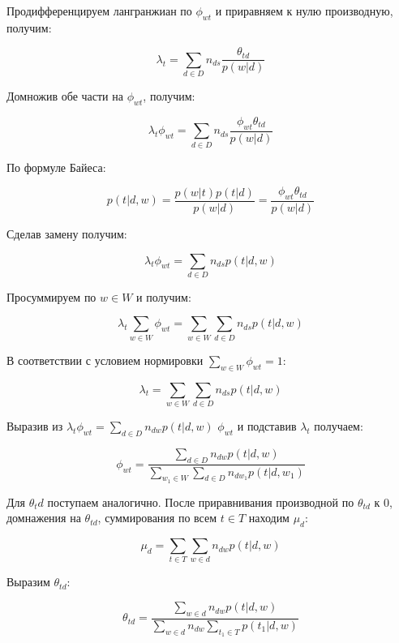 Продифференцируем лангранжиан по $\phi_{wt}$ и приравняем к нулю производную, получим:

$$\lambda_{t} = \sum_{d \in D} n_{ds} \frac{\theta_{td}}{p(w|d)}$$

Домножив обе части на $\phi_{wt}$, получим:

$$\lambda_{t} \phi_{wt} = \sum_{d \in D} n_{ds} \frac{\phi_{wt} \theta_{td}}{p(w|d)}$$

По формуле Байеса:

$$p(t|d,w) = \frac{p(w|t) p(t|d)}{p(w|d)} = \frac{\phi_{wt} \theta_{td}}{p(w|d)}$$

Сделав замену  получим:

$$\lambda_{t} \phi_{wt} = \sum_{d \in D} n_{ds} p(t|d,w)$$

Просуммируем по $w \in W$ и получим:

$$\lambda_{t} \sum_{w \in W} \phi_{wt} = \sum_{w \in W} \sum_{d \in D} n_{ds} p(t|d,w)$$

В соответствии с условием нормировки $\sum_{w \in W} \phi_{wt} = 1$:

$$\lambda_{t} = \sum_{w \in W} \sum_{d \in D} n_{ds} p(t|d,w)$$

Выразив из $\lambda_t \phi_{wt} = \sum_{d \in D} n_{dw} p(t|d,w)$ $\phi_{wt}$ и подставив $\lambda_{t}$ получаем:

$$\phi_{wt} = \frac{\sum_{d \in D} n_{dw} p(t|d,w)}{\sum_{w_{1} \in W} \sum_{d \in D} n_{dw_{1}} p(t|d,w_{1})}$$

Для $\theta_td$ поступаем аналогично. После приравнивания производной по $\theta_{td}$ к $0$, домнажения на $\theta_{td}$, суммирования по всем $t \in T$ находим $\mu_{d}$:

$$\mu_{d} = \sum_{t \in T} \sum_{w \in d} n_{dw} p(t|d,w)$$

Выразим $\theta_{td}$:

$$\theta_{td} = \frac{\sum_{w \in d} n_{dw} p(t|d,w)}{\sum_{w \in d} n_{dw} \sum_{t_{1} \in T} p(t_{1}|d,w)}$$

